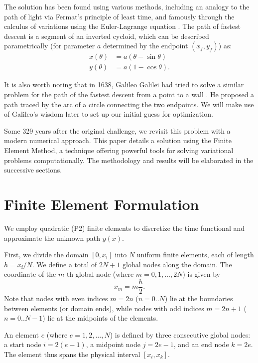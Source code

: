 \documentclass[11pt]{article}
\begin{document}
The solution has been found using various methods, including an analogy to the path of light via Fermat's principle of least time, and famously through the calculus of variations using the Euler-Lagrange equation \cite{WeissteinBrachistochrone}. The path of fastest descent is a segment of an inverted cycloid, which can be described parametrically (for parameter $a$ determined by the endpoint $(x_f, y_f)$) as:
\begin{align*}
x(\theta) &= a (\theta - \sin \theta) \\
y(\theta) &= a (1 - \cos \theta).
\end{align*}


It is also worth noting that in 1638, Galileo Galilei had tried to solve a similar problem for the path of the fastest descent from a point to a wall \cite{Galilei1638Discorsi}. He proposed a path traced by the arc of a circle connecting the two endpoints. We will make use of Galileo's wisdom later to set up our initial guess for optimization.

 Some 329 years after the original challenge, we revisit this problem with a modern numerical approach. This paper details a solution using the Finite Element Method, a technique offering powerful tools for solving variational problems computationally. The methodology and results will be elaborated in the successive sections.
\section{Finite Element Formulation}
    
    We employ quadratic (P2) finite elements to discretize the time functional and approximate the unknown path \(y(x)\).
    
    First, we divide the domain \( \left[0, x_{\mathrm{f}}\right] \) into \(N \) uniform finite elements, each of length \( h = x_{\mathrm{f}} / N \). We define a total of \(2N+1\) global nodes along the domain. The coordinate of the \(m\)-th global node (where \(m = 0, 1, \ldots, 2N\)) is given by
    \[ x_m = m \frac{h}{2}. \]
    Note that nodes with even indices \(m=2n\) ($n=0..N$) lie at the boundaries between elements (or domain ends), while nodes with odd indices \(m=2n+1\) ($n=0..N-1$) lie at the midpoints of the elements.
    
    An element \(e\) (where \(e = 1, 2, \ldots, N\)) is defined by three consecutive global nodes: a start node \(i = 2(e-1)\), a midpoint node \(j = 2e-1\), and an end node \(k = 2e\). The element thus spans the physical interval \( [x_i, x_k] \).
    
\end{document}
